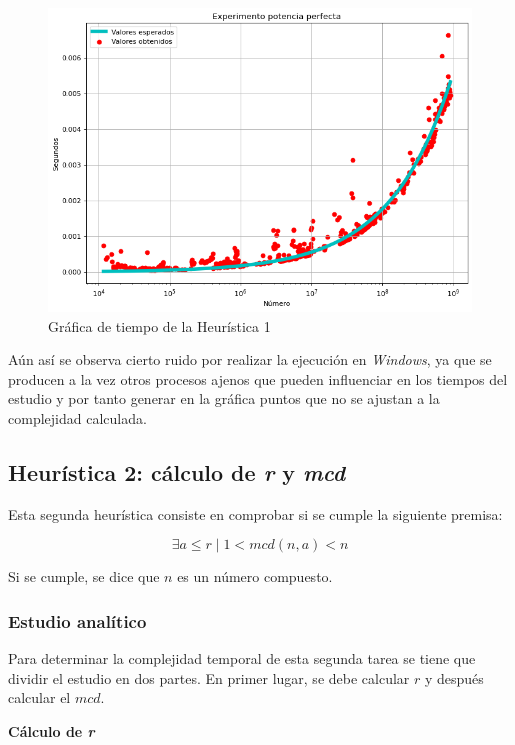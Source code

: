 \documentclass{uc3mpracticas}
\begin{document}
  \begin{figure}[!h]
    \centering
    \includegraphics[width=.8\linewidth]{./Images/h1.png}
    \caption{Gráfica de tiempo de la Heurística 1}
    \label{fig:h1}
  \end{figure}

  Aún así se observa cierto ruido por realizar la ejecución en \textit{Windows}, ya que se producen a la vez otros procesos ajenos que pueden influenciar en los tiempos del estudio y por tanto generar en la gráfica puntos que no se ajustan a la complejidad calculada.




  \subsection{Heurística 2: cálculo de \textit{r} y \textit{mcd}}

  Esta segunda heurística consiste en comprobar si se cumple la siguiente premisa:

  $$ \exists a \leq r \mid 1 < mcd(n,a) < n $$

  Si se cumple, se dice que $n$ es un número compuesto.


  \subsubsection{Estudio analítico}
  Para determinar la complejidad temporal de esta segunda tarea se tiene que dividir el estudio en dos partes. En primer lugar, se debe calcular $r$ y después calcular el $mcd$.

  \vspace{4mm}

  \textbf{Cálculo de \textit{r}}

  \vspace{2mm}
\end{document}
